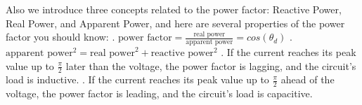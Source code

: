 Also we introduce three concepts related to the power factor: Reactive Power, Real Power, and Apparent Power, and here are several properties of the power factor you should know:
. $\text{power factor}=\frac{\text{real power}}{\text{apparent power}}=cos({\theta}_d)$
. $\text{apparent power}^2=\text{real power}^2+\text{reactive power}^2$
. If the current reaches its peak value up to $\frac{\pi}{2}$ later than the voltage, the power factor is lagging, and the circuit's load is inductive.
. If the current reaches its peak value up to $\frac{\pi}{2}$ ahead of the voltage, the power factor is leading, and the circuit's load is capacitive.
